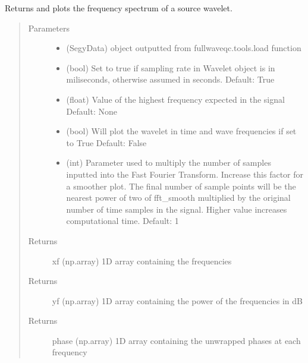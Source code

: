 \documentclass[letterpaper,10pt,english]{sphinxmanual}
\begin{document}
\begin{fulllineitems}
\label{\detokenize{index:fullwaveqc.siganalysis.wavespec}}
Returns and plots the frequency spectrum of a source wavelet.
\begin{quote}\begin{description}
\item[{Parameters}] \leavevmode\begin{itemize}
\item {} 
 \textendash{} (SegyData)   object outputted from fullwaveqc.tools.load function

\item {} 
 \textendash{} (bool)       Set to true if sampling rate in Wavelet object is in miliseconds, otherwise assumed
in seconds. Default: True

\item {} 
 \textendash{} (float)      Value of the highest frequency expected in the signal
Default: None

\item {} 
 \textendash{} (bool)       Will plot the wavelet in time and wave frequencies if set to True
Default: False

\item {} 
 \textendash{} (int)        Parameter used to multiply the number of samples inputted into the Fast Fourier
Transform. Increase this factor for a smoother plot. The final number of sample
points will be the nearest power of two of fft\_smooth multiplied by the original
number of time samples in the signal. Higher value increases computational time.
Default: 1

\end{itemize}

\item[{Returns}] \leavevmode
xf          (np.array)   1D array containing the frequencies

\item[{Returns}] \leavevmode
yf          (np.array)   1D array containing the power of the frequencies in dB

\item[{Returns}] \leavevmode
phase       (np.array)   1D array containing the unwrapped phases at each frequency

\end{description}\end{quote}

\end{fulllineitems}
\end{document}
